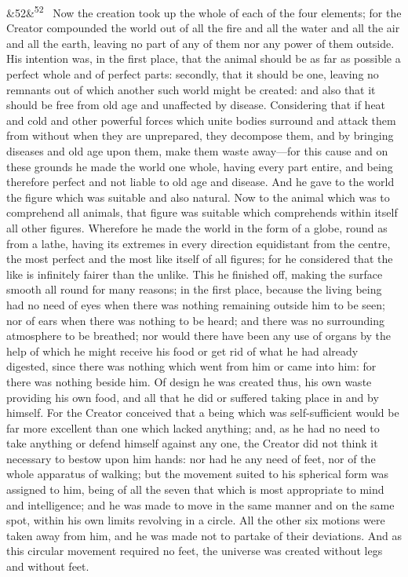 \documentclass[12pt]{article}
\newcommand{\para}[1][]{\par\noindent\ifx&#1&\else\textsuperscript{\footnotesize #1}~\fi}
\begin{document}
\para[52] Now the creation took up the whole of each of the four elements; for the Creator compounded the world out of all the fire and all the water and all the air and all the earth, leaving no part of any of them nor any power of them outside. His intention was, in the first place, that the animal should be as far as possible a perfect whole and of perfect parts: secondly, that it should be one, leaving no remnants out of which another such world might be created: and also that it should be free from old age and unaffected by disease. Considering that if heat and cold and other powerful forces which unite bodies surround and attack them from without when they are unprepared, they decompose them, and by bringing diseases and old age upon them, make them waste away---for this cause and on these grounds he made the world one whole, having every part entire, and being therefore perfect and not liable to old age and disease. And he gave to the world the figure which was suitable and also natural. Now to the animal which was to comprehend all animals, that figure was suitable which comprehends within itself all other figures. Wherefore he made the world in the form of a globe, round as from a lathe, having its extremes in every direction equidistant from the centre, the most perfect and the most like itself of all figures; for he considered that the like is infinitely fairer than the unlike. This he finished off, making the surface smooth all round for many reasons; in the first place, because the living being had no need of eyes when there was nothing remaining outside him to be seen; nor of ears when there was nothing to be heard; and there was no surrounding atmosphere to be breathed; nor would there have been any use of organs by the help of which he might receive his food or get rid of what he had already digested, since there was nothing which went from him or came into him: for there was nothing beside him. Of design he was created thus, his own waste providing his own food, and all that he did or suffered taking place in and by himself. For the Creator conceived that a being which was self-sufficient would be far more excellent than one which lacked anything; and, as he had no need to take anything or defend himself against any one, the Creator did not think it necessary to bestow upon him hands: nor had he any need of feet, nor of the whole apparatus of walking; but the movement suited to his spherical form was assigned to him, being of all the seven that which is most appropriate to mind and intelligence; and he was made to move in the same manner and on the same spot, within his own limits revolving in a circle. All the other six motions were taken away from him, and he was made not to partake of their deviations. And as this circular movement required no feet, the universe was created without legs and without feet.
\end{document}
